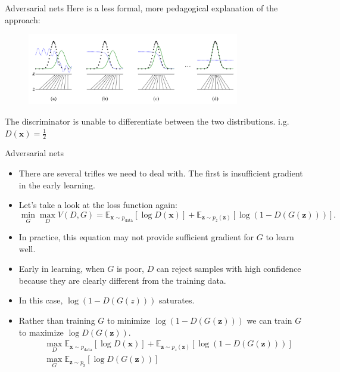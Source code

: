 \documentclass[10pt]{beamer}
\begin{document}
	\begin{frame}[t]{Adversarial nets}
		Here is a less formal, more pedagogical explanation of the approach:
		\begin{figure}
			\includegraphics[width=25em]{figures/GAN-pedagogical-explanation.png}
		\end{figure}
		The discriminator is unable to differentiate between the two distributions. i.g. $D(\bm{x})=\frac{1}{2}$
	\end{frame}

	\begin{frame}{Adversarial nets}
	
		\begin{itemize}
			\item There are several trifles we need to deal with. The first is insufficient gradient in the early learning.
			
			\item Let's take a look at the loss function again:
			$$
			\mathop{\min}_{G}\mathop{\max}_{D}V(D,G)=\mathbb{E}_{\bm{x}\sim p_{\text{data}}}\left[\log D(\bm{x})\right]+\mathbb{E}_{\bm{z}\sim p_z(\bm{z})}\left[\log(1-D(G(\bm{z})))\right].
			$$
			\item In practice, this equation may not provide sufficient gradient for $G$ to learn well.
			\item Early in learning, when $G$ is poor, $D$ can reject samples with high confidence because they are clearly different from the training data.
			\item In this case, $\log(1-D(G(z)))$ saturates.
			\item Rather than training $G$ to minimize $\log(1-D(G(\bm{z})))$ we can train $G$ to maximize $\log D(G(\bm{z}))$.
			\begin{eqnarray*}
			&&\mathop{\max}_{D}\mathbb{E}_{\bm{x}\sim p_{\text{data}}}\left[\log D(\bm{x})\right]+\mathbb{E}_{\bm{z}\sim p_z(\bm{z})}\left[\log(1-D(G(\bm{z})))\right] \\
			&&\mathop{\max}_{G}\mathbb{E}_{\bm{z}\sim p_{\text{z}}}\left[\log D(G(\bm{z}))\right]
			\end{eqnarray*}
		\end{itemize}
	\end{frame}
\end{document}
